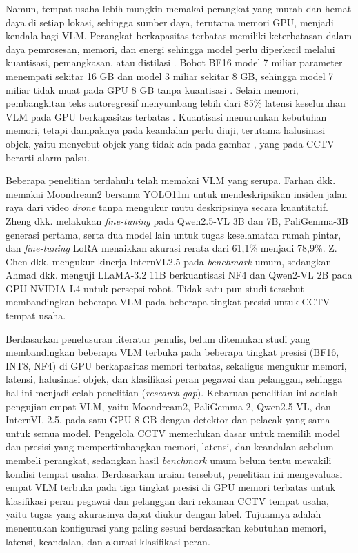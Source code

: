 Namun, tempat usaha lebih mungkin memakai perangkat yang murah dan hemat daya di setiap lokasi, sehingga sumber daya, terutama memori GPU, menjadi kendala bagi VLM. Perangkat berkapasitas terbatas memiliki keterbatasan dalam daya pemrosesan, memori, dan energi sehingga model perlu diperkecil melalui kuantisasi, pemangkasan, atau distilasi \cite{ref14}. Bobot BF16 model 7 miliar parameter menempati sekitar 16 GB dan model 3 miliar sekitar 8 GB, sehingga model 7 miliar tidak muat pada GPU 8 GB tanpa kuantisasi \cite{ref32}. Selain memori, pembangkitan teks autoregresif menyumbang lebih dari 85\% latensi keseluruhan VLM pada GPU berkapasitas terbatas \cite{ref24}. Kuantisasi menurunkan kebutuhan memori, tetapi dampaknya pada keandalan perlu diuji, terutama halusinasi objek, yaitu menyebut objek yang tidak ada pada gambar \cite{ref9}, yang pada CCTV berarti alarm palsu.

Beberapa penelitian terdahulu telah memakai VLM yang serupa. Farhan dkk. \cite{ref31} memakai Moondream2 bersama YOLO11m untuk mendeskripsikan insiden jalan raya dari video \textit{drone} tanpa mengukur mutu deskripsinya secara kuantitatif. Zheng dkk. \cite{ref32} melakukan \textit{fine-tuning} pada Qwen2.5-VL 3B dan 7B, PaliGemma-3B generasi pertama, serta dua model lain untuk tugas keselamatan rumah pintar, dan \textit{fine-tuning} LoRA menaikkan akurasi rerata dari 61,1\% menjadi 78,9\%. Z. Chen dkk. \cite{ref29} mengukur kinerja InternVL2.5 pada \textit{benchmark} umum, sedangkan Ahmad dkk. \cite{ref24} menguji LLaMA-3.2 11B berkuantisasi NF4 dan Qwen2-VL 2B pada GPU NVIDIA L4 untuk persepsi robot. Tidak satu pun studi tersebut membandingkan beberapa VLM pada beberapa tingkat presisi untuk CCTV tempat usaha.

Berdasarkan penelusuran literatur penulis, belum ditemukan studi yang membandingkan beberapa VLM terbuka pada beberapa tingkat presisi (BF16, INT8, NF4) di GPU berkapasitas memori terbatas, sekaligus mengukur memori, latensi, halusinasi objek, dan klasifikasi peran pegawai dan pelanggan, sehingga hal ini menjadi celah penelitian (\textit{research gap}). Kebaruan penelitian ini adalah pengujian empat VLM, yaitu Moondream2, PaliGemma 2, Qwen2.5-VL, dan InternVL 2.5, pada satu GPU 8 GB dengan detektor dan pelacak yang sama untuk semua model. Pengelola CCTV memerlukan dasar untuk memilih model dan presisi yang mempertimbangkan memori, latensi, dan keandalan sebelum membeli perangkat, sedangkan hasil \textit{benchmark} umum belum tentu mewakili kondisi tempat usaha. Berdasarkan uraian tersebut, penelitian ini mengevaluasi empat VLM terbuka pada tiga tingkat presisi di GPU memori terbatas untuk klasifikasi peran pegawai dan pelanggan dari rekaman CCTV tempat usaha, yaitu tugas yang akurasinya dapat diukur dengan label. Tujuannya adalah menentukan konfigurasi yang paling sesuai berdasarkan kebutuhan memori, latensi, keandalan, dan akurasi klasifikasi peran.

